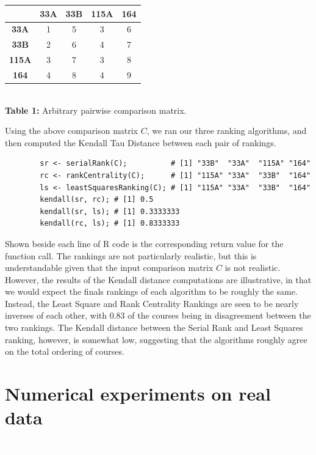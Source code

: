 \documentclass[10pt]{siamltex}
\begin{document}
\begin{pagewiselinenumbers}
\begin{center}
\begin{table}
\end{table}
\begin{tabular}{ c | c | c | c | c}
& \textbf{33A} & \textbf{33B} & \textbf{115A} & \textbf{164}\\\hline
\textbf{33A}    & 1 & 5  & 3 & 6\\
\textbf{33B}    & 2 & 6  & 4 & 7\\
\textbf{115A} &  3 & 7 & 3 & 8\\
\textbf{164}    &  4 & 8 & 4 & 9\\
\end{tabular}
\\\textbf{Table 1:} Arbitrary pairwise comparison matrix. 
\end{center}

Using the above comparison matrix $C$, we ran our three ranking algorithms, and then computed the Kendall Tau Distance between each pair of rankings.\\

\begin{verbatim}
        sr <- serialRank(C);          # [1] "33B"  "33A"  "115A" "164" 
        rc <- rankCentrality(C);      # [1] "115A" "33A"  "33B"  "164" 
        ls <- leastSquaresRanking(C); # [1] "115A" "33A"  "33B"  "164"
        kendall(sr, rc); # [1] 0.5
        kendall(sr, ls); # [1] 0.3333333
        kendall(rc, ls); # [1] 0.8333333
\end{verbatim}

Shown beside each line of R code is the corresponding return value for the function call. The rankings are not particularly realistic, but this is understandable given that the input comparison matrix $C$ is not realistic. However, the results of the Kendall distance computations are illustrative, in that we would expect the finals rankings of each algorithm to be roughly the same. Instead, the Least Square and Rank Centrality Rankings are seen to be nearly inverses of each other, with 0.83 of the courses being in disagreement between the two rankings. The Kendall distance between the Serial Rank and Least Squares ranking, however, is somewhat low, suggesting that the algorithms roughly agree on the total ordering of courses.

\section{Numerical experiments on real data}   \label{sec:NumExpReal}\textcolor{white}{.}


\end{pagewiselinenumbers}
\end{document}
